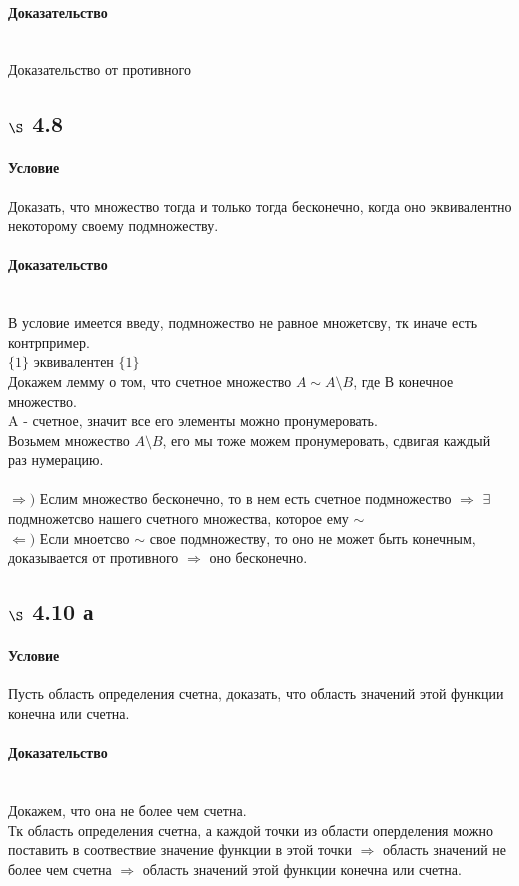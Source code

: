 \documentclass[a4paper,12pt]{article}
\begin{document}
\paragraph*{Доказательство}\mbox{}\\
Доказательство от противного

\subsection*{$\S$ 4.8}
\paragraph*{Условие}
Доказать, что множество тогда и только тогда бесконечно, когда оно эквивалентно некоторому своему подмножеству.
\paragraph*{Доказательство}\mbox{}\\
В условие имеется введу, подмножество не равное множетсву, тк иначе есть контрпример.\\
$\{1\}$ эквивалентен $\{1\}$\\
Докажем лемму о том, что счетное множество $ A \sim A \setminus B $, где В конечное множество.\\
A - счетное, значит все его элементы можно пронумеровать. \\
Возьмем множество  $A \setminus B $, его мы тоже можем пронумеровать, сдвигая каждый раз нумерацию.\\
\\
$\Rightarrow ) $ Еслим множество бесконечно, то в нем есть счетное подмножество $\Rightarrow$ $\exists$ подмножетсво нашего счетного множества, которое ему  $ \sim $\\
$\Leftarrow )$ Если мноетсво $ \sim $ свое подмножеству, то оно не может быть конечным, доказывается от противного $\Rightarrow$ оно бесконечно.

\subsection*{$\S$ 4.10 а}
\paragraph*{Условие}
Пусть область определения счетна, доказать, что область значений этой функции конечна или счетна. \paragraph*{Доказательство}\mbox{}\\
Докажем, что она не более чем счетна.\\
Тк область определения счетна, а каждой точки из области оперделения можно поставить в соотвествие значение функции в этой точки $\Rightarrow$ область значений не более чем счетна $\Rightarrow$ область значений этой функции конечна или счетна.\\
\end{document}
